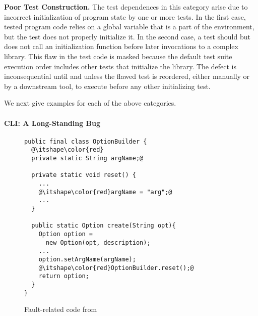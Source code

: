 \vspace{1mm}

\noindent \textbf{Poor Test Construction.}
The test dependences in this category arise due to incorrect initialization
of program state by one or more tests. In the first case,
tested program code relies on a
global variable that is a part of the environment, but the test does
not properly initialize it.  In the second case, a test should but
does not call
an initialization function before later invocations to a complex library.
This flaw in the test code is masked because the default test suite execution
order includes other tests that initialize the library.  The defect is
inconsequential until and unless the flawed test is reordered, either manually or by
a downstream tool, to execute before any other initializing test.






We next give examples for each of the above categories.

\paragraph{CLI: A Long-Standing Bug}

\begin{figure}
\begin{lstlisting}
public final class OptionBuilder {
  @\itshape\color{red}
  private static String argName;@
  
  private static void reset() {
    ...
    @\itshape\color{red}argName = "arg";@
    ...
  }
   
  public static Option create(String opt){
    Option option = 
      new Option(opt, description);
    ...
    option.setArgName(argName);
    @\itshape\color{red}OptionBuilder.reset();@
    return option;
  }
}
\end{lstlisting}
\caption{Fault-related code from }
\label{fig:option_builder}
\end{figure}

